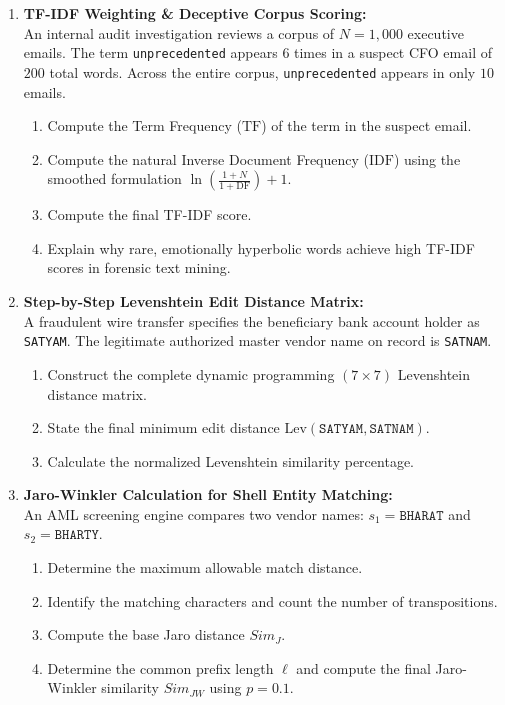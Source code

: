 \begin{enumerate}[label=\textbf{P11.\arabic*}]
    \item \textbf{TF-IDF Weighting \& Deceptive Corpus Scoring:}\\
    An internal audit investigation reviews a corpus of $N = 1{,}000$ executive emails. The term \texttt{unprecedented} appears $6$ times in a suspect CFO email of $200$ total words. Across the entire corpus, \texttt{unprecedented} appears in only $10$ emails.
    \begin{enumerate}[label=(\alph*)]
        \item Compute the Term Frequency ($\text{TF}$) of the term in the suspect email.
        \item Compute the natural Inverse Document Frequency ($\text{IDF}$) using the smoothed formulation $\ln\left(\frac{1 + N}{1 + \text{DF}}\right) + 1$.
        \item Compute the final TF-IDF score.
        \item Explain why rare, emotionally hyperbolic words achieve high TF-IDF scores in forensic text mining.
    \end{enumerate}

    \item \textbf{Step-by-Step Levenshtein Edit Distance Matrix:}\\
    A fraudulent wire transfer specifies the beneficiary bank account holder as \texttt{SATYAM}. The legitimate authorized master vendor name on record is \texttt{SATNAM}.
    \begin{enumerate}[label=(\alph*)]
        \item Construct the complete dynamic programming $(7 \times 7)$ Levenshtein distance matrix.
        \item State the final minimum edit distance $\text{Lev}(\texttt{SATYAM}, \texttt{SATNAM})$.
        \item Calculate the normalized Levenshtein similarity percentage.
    \end{enumerate}

    \item \textbf{Jaro-Winkler Calculation for Shell Entity Matching:}\\
    An AML screening engine compares two vendor names: $s_1 = \texttt{BHARAT}$ and $s_2 = \texttt{BHARTY}$.
    \begin{enumerate}[label=(\alph*)]
        \item Determine the maximum allowable match distance.
        \item Identify the matching characters and count the number of transpositions.
        \item Compute the base Jaro distance $Sim_J$.
        \item Determine the common prefix length $\ell$ and compute the final Jaro-Winkler similarity $Sim_{JW}$ using $p = 0.1$.
    \end{enumerate}


\end{enumerate}
